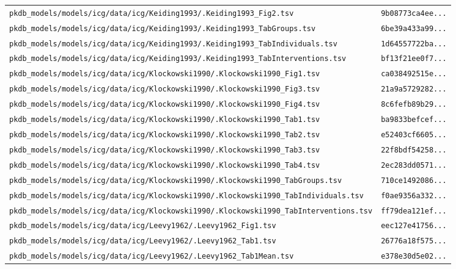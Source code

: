 \documentclass{article}
\begin{document}
\begin{longtable}{ll}
\texttt{pkdb\_models/models/icg/data/icg/Keiding1993/.Keiding1993\_Fig2.tsv} & \texttt{9b08773ca4ee...} \\
\texttt{pkdb\_models/models/icg/data/icg/Keiding1993/.Keiding1993\_TabGroups.tsv} & \texttt{6be39a433a99...} \\
\texttt{pkdb\_models/models/icg/data/icg/Keiding1993/.Keiding1993\_TabIndividuals.tsv} & \texttt{1d64557722ba...} \\
\texttt{pkdb\_models/models/icg/data/icg/Keiding1993/.Keiding1993\_TabInterventions.tsv} & \texttt{bf13f21ee0f7...} \\
\texttt{pkdb\_models/models/icg/data/icg/Klockowski1990/.Klockowski1990\_Fig1.tsv} & \texttt{ca038492515e...} \\
\texttt{pkdb\_models/models/icg/data/icg/Klockowski1990/.Klockowski1990\_Fig3.tsv} & \texttt{21a9a5729282...} \\
\texttt{pkdb\_models/models/icg/data/icg/Klockowski1990/.Klockowski1990\_Fig4.tsv} & \texttt{8c6fefb89b29...} \\
\texttt{pkdb\_models/models/icg/data/icg/Klockowski1990/.Klockowski1990\_Tab1.tsv} & \texttt{ba9833befcef...} \\
\texttt{pkdb\_models/models/icg/data/icg/Klockowski1990/.Klockowski1990\_Tab2.tsv} & \texttt{e52403cf6605...} \\
\texttt{pkdb\_models/models/icg/data/icg/Klockowski1990/.Klockowski1990\_Tab3.tsv} & \texttt{22f8bdf54258...} \\
\texttt{pkdb\_models/models/icg/data/icg/Klockowski1990/.Klockowski1990\_Tab4.tsv} & \texttt{2ec283dd0571...} \\
\texttt{pkdb\_models/models/icg/data/icg/Klockowski1990/.Klockowski1990\_TabGroups.tsv} & \texttt{710ce1492086...} \\
\texttt{pkdb\_models/models/icg/data/icg/Klockowski1990/.Klockowski1990\_TabIndividuals.tsv} & \texttt{f0ae9356a332...} \\
\texttt{pkdb\_models/models/icg/data/icg/Klockowski1990/.Klockowski1990\_TabInterventions.tsv} & \texttt{ff79dea121ef...} \\
\texttt{pkdb\_models/models/icg/data/icg/Leevy1962/.Leevy1962\_Fig1.tsv} & \texttt{eec127e41756...} \\
\texttt{pkdb\_models/models/icg/data/icg/Leevy1962/.Leevy1962\_Tab1.tsv} & \texttt{26776a18f575...} \\
\texttt{pkdb\_models/models/icg/data/icg/Leevy1962/.Leevy1962\_Tab1Mean.tsv} & \texttt{e378e30d5e02...} \\

\end{longtable}
\end{document}
